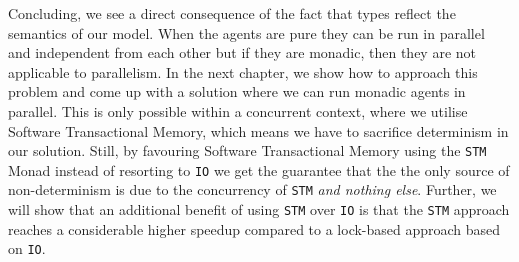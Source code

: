 Concluding, we see a direct consequence of the fact that types reflect the semantics of our model. When the agents are pure they can be run in parallel and independent from each other but if they are monadic, then they are not applicable to parallelism. In the next chapter, we show how to approach this problem and come up with a solution where we can run monadic agents in parallel. This is only possible within a concurrent context, where we utilise Software Transactional Memory, which means we have to sacrifice determinism in our solution. Still, by favouring Software Transactional Memory using the \texttt{STM} Monad instead of resorting to \texttt{IO} we get the guarantee that the the only source of non-determinism is due to the concurrency of \texttt{STM} \textit{and nothing else}. Further, we will show that an additional benefit of using \texttt{STM} over \texttt{IO} is that the \texttt{STM} approach reaches a considerable higher speedup compared to a lock-based approach based on \texttt{IO}. 